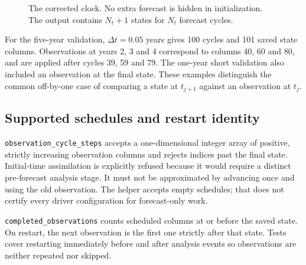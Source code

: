 \documentclass[11pt,a4paper]{article}
\newcommand{\code}[1]{\nolinkurl{#1}}
\begin{document}
\begin{figure}[htbp]\centering
{}
\caption{The corrected clock. No extra forecast is hidden in initialization. The output contains \(N_t+1\) states for \(N_t\) forecast cycles.}\label{fig:clock}
\end{figure}

For the five-year validation, \(\Delta t=0.05\) years gives 100 cycles and 101 saved state columns. Observations at years 2, 3 and 4 correspond to columns 40, 60 and 80, and are applied after cycles 39, 59 and 79. The one-year short validation also included an observation at the final state. These examples distinguish the common off-by-one case of comparing a state at \(t_{j+1}\) against an observation at \(t_j\).

\subsection{Supported schedules and restart identity}
\code{observation_cycle_steps} accepts a one-dimensional integer array of positive, strictly increasing observation columns and rejects indices past the final state. Initial-time assimilation is explicitly refused because it would require a distinct pre-forecast analysis stage. It must not be approximated by advancing once and using the old observation. The helper accepts empty schedules; that does not certify every driver configuration for forecast-only work.

\code{completed_observations} counts scheduled columns at or before the saved state. On restart, the next observation is the first one strictly after that state. Tests cover restarting immediately before and after analysis events so observations are neither repeated nor skipped.
\end{document}
